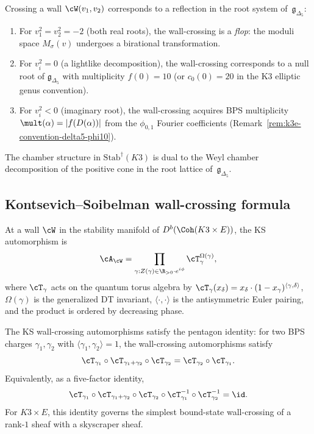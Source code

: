 \begin{proposition}
\label{prop:k3e-walls-roots}
Crossing a wall $\cW(v_1, v_2)$ corresponds to a reflection in the root system of~$\mathfrak{g}_{\Delta_5}$:
\begin{enumerate}[label=(\roman*)]
 \item For $v_1^2 = v_2^2 = -2$ (both real roots), the wall-crossing is a \emph{flop}: the moduli space $M_\sigma(v)$ undergoes a birational transformation.
 \item For $v_i^2 = 0$ (a lightlike decomposition), the wall-crossing corresponds to a null root of $\mathfrak{g}_{\Delta_5}$ with multiplicity $f(0) = 10$ (or $c_0(0) = 20$ in the K3 elliptic genus convention).
 \item For $v_i^2 < 0$ (imaginary root), the wall-crossing acquires BPS multiplicity $\mult(\alpha) = |f(D(\alpha))|$ from the $\phi_{0,1}$ Fourier coefficients (Remark~\ref{rem:k3e-convention-delta5-phi10}).
\end{enumerate}
The chamber structure in $\mathrm{Stab}^\dagger(K3)$ is dual to the Weyl chamber decomposition of the positive cone in the root lattice of~$\mathfrak{g}_{\Delta_5}$.
\ClaimStatusProvedElsewhere
\end{proposition}

\subsection{Kontsevich--Soibelman wall-crossing formula}
\label{subsec:k3e-ks-formula}

\begin{theorem}
\label{thm:k3e-ks-wc}
\ClaimStatusProvedElsewhere
At a wall $\cW$ in the stability manifold of $D^b(\Coh(K3 \times E))$, the KS automorphism is
\[
 \cA_{\cW} = \prod_{\substack{\gamma : Z(\gamma) \in \R_{>0} \cdot e^{i\phi}}} \cT_\gamma^{\Omega(\gamma)},
\]
where $\cT_\gamma$ acts on the quantum torus algebra by $\cT_\gamma(x_\delta) = x_\delta \cdot (1 - x_\gamma)^{\langle \gamma, \delta \rangle}$, $\Omega(\gamma)$ is the generalized DT invariant, $\langle \cdot, \cdot \rangle$ is the antisymmetric Euler pairing, and the product is ordered by decreasing phase.
\ClaimStatusProvedElsewhere
\end{theorem}

\begin{proposition}
\label{prop:k3e-pentagon}
The KS wall-crossing automorphisms satisfy the pentagon identity: for two BPS charges $\gamma_1, \gamma_2$ with $\langle \gamma_1, \gamma_2 \rangle = 1$, the wall-crossing automorphisms satisfy
\[
 \cT_{\gamma_1} \circ \cT_{\gamma_1 + \gamma_2} \circ \cT_{\gamma_2} = \cT_{\gamma_2} \circ \cT_{\gamma_1}.
\]
Equivalently, as a five-factor identity,
\[
 \cT_{\gamma_1} \circ \cT_{\gamma_1 + \gamma_2} \circ \cT_{\gamma_2} \circ \cT_{\gamma_1}^{-1} \circ \cT_{\gamma_2}^{-1} = \id.
\]
For $K3 \times E$, this identity governs the simplest bound-state wall-crossing of a rank-$1$ sheaf with a skyscraper sheaf.
\ClaimStatusProvedElsewhere
\end{proposition}

